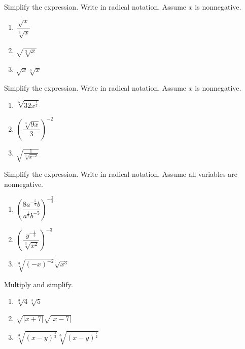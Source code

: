 \documentclass[en,12pt]{elegantbook}
\providecommand{\tightlist}{%
  \setlength{\itemsep}{0pt}\setlength{\parskip}{0pt}}
\providecommand{\tightlist}{%
  \setlength{\itemsep}{0pt}\setlength{\parskip}{0pt}}
\let\BeginKnitrBlock\begin \let\EndKnitrBlock\end
\begin{document}
\BeginKnitrBlock{exercise}
\protect\hypertarget{exr:unnamed-chunk-92}{}{\label{exr:unnamed-chunk-92} }
Simplify the expression. Write in radical notation. Assume \(x\) is nonnegative.

\begin{enumerate}
\def\labelenumi{\arabic{enumi}.}
\tightlist
\item
  \(\dfrac{\sqrt{x}}{\sqrt[3]{x}}\)
\item
  \(\sqrt{\sqrt[3]{x}}\)
\item
  \(\sqrt{x}\sqrt[3]{x}\)
\end{enumerate}
\EndKnitrBlock{exercise}

\BeginKnitrBlock{exercise}
\protect\hypertarget{exr:unnamed-chunk-93}{}{\label{exr:unnamed-chunk-93} }
Simplify the expression. Write in radical notation. Assume \(x\) is nonnegative.

\begin{enumerate}
\def\labelenumi{\arabic{enumi}.}
\tightlist
\item
  \(\sqrt[5]{32x^{\frac13}}\)
\item
  \(\left(\dfrac{\sqrt[4]{9x}}{3}\right)^{-2}\)
\item
  \(\sqrt{\frac{1}{\sqrt[3]{x^{-2}}}}\)
\end{enumerate}
\EndKnitrBlock{exercise}

\BeginKnitrBlock{exercise}
\protect\hypertarget{exr:unnamed-chunk-94}{}{\label{exr:unnamed-chunk-94} }
Simplify the expression. Write in radical notation. Assume all variables are nonnegative.

\begin{enumerate}
\def\labelenumi{\arabic{enumi}.}
\tightlist
\item
  \(\left(\dfrac{8a^{-\frac{5}{2}}b}{a^{\frac12}b^{-5}}\right)^{-\frac23}\)
\item
  \(\left(\dfrac{y^{-\frac{1}{3}}}{\sqrt[3]{x^{2}}}\right)^{-3}\)
\item
  \(\sqrt[3]{(-x)^{-2}}\sqrt{x^3}\)
\end{enumerate}
\EndKnitrBlock{exercise}

\BeginKnitrBlock{exercise}
\protect\hypertarget{exr:unnamed-chunk-95}{}{\label{exr:unnamed-chunk-95} }
Multiply and simplify.

\begin{enumerate}
\def\labelenumi{\arabic{enumi}.}
\tightlist
\item
  \(\sqrt[3]{4}\sqrt[3]{5}\)
\item
  \(\sqrt{|x+7|}\sqrt{|x-7|}\)
\item
  \(\sqrt[3]{(x-y)^{\frac52}}\sqrt[3]{(x-y)^{\frac72}}\)
\end{enumerate}
\EndKnitrBlock{exercise}
\end{document}
